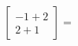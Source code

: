 \documentclass[preview]{standalone}
\begin{document}
\begin{align*}
\
                \begin{bmatrix}-1+2\\2+1\end{bmatrix}=\\
\end{align*}
\end{document}
